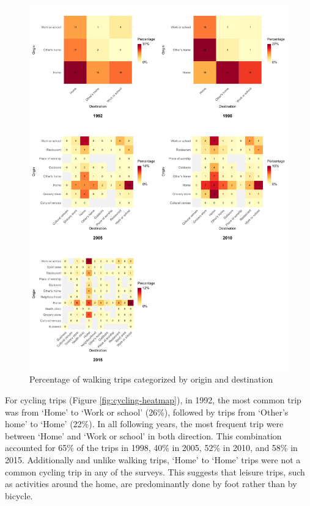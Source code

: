 \documentclass[preprint, 3p,
authoryear]{elsarticle} %
\begin{document}
\begin{figure}

{\centering \includegraphics[width=1\linewidth]{figures/walking_hm_fig} 

}

\caption{Percentage of walking trips categorized by origin and destination}\label{fig:walking-heatmap}
\end{figure}

For cycling trips (Figure \ref{fig:cycling-heatmap}), in 1992, the most
common trip was from `Home' to `Work or school' (26\%), followed by
trips from `Other's home' to `Home' (22\%). In all following years, the
most frequent trip were between `Home' and `Work or school' in both
direction. This combination accounted for 65\% of the trips in 1998,
40\% in 2005, 52\% in 2010, and 58\% in 2015. Additionally and unlike
walking trips, `Home' to `Home' trips were not a common cycling trip in
any of the surveys. This suggests that leisure trips, such as activities
around the home, are predominantly done by foot rather than by bicycle.
\end{document}
